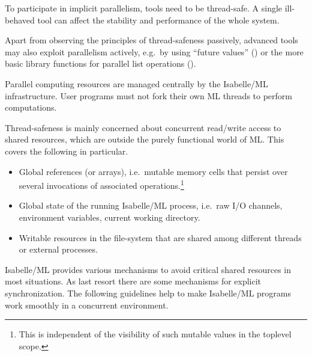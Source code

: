 \begin{isabellebody}
\begin{isamarkuptext}
  \begin{warn}
  To participate in implicit parallelism, tools need to be
  thread-safe.  A single ill-behaved tool can affect the stability and
  performance of the whole system.
  \end{warn}

  Apart from observing the principles of thread-safeness passively,
  advanced tools may also exploit parallelism actively, e.g.\ by using
  ``future values'' () or the more basic library
  functions for parallel list operations ().

  \begin{warn}
  Parallel computing resources are managed centrally by the
  Isabelle/ML infrastructure.  User programs must not fork their own
  ML threads to perform computations.
  \end{warn}%
\end{isamarkuptext}%
\isamarkuptrue%
%
\isamarkuptrue%
%
\begin{isamarkuptext}%
Thread-safeness is mainly concerned about concurrent
  read/write access to shared resources, which are outside the purely
  functional world of ML.  This covers the following in particular.

  \begin{itemize}

  \item Global references (or arrays), i.e.\ mutable memory cells that
  persist over several invocations of associated
  operations.\footnote{This is independent of the visibility of such
  mutable values in the toplevel scope.}

  \item Global state of the running Isabelle/ML process, i.e.\ raw I/O
  channels, environment variables, current working directory.

  \item Writable resources in the file-system that are shared among
  different threads or external processes.

  \end{itemize}

  Isabelle/ML provides various mechanisms to avoid critical shared
  resources in most situations.  As last resort there are some
  mechanisms for explicit synchronization.  The following guidelines
  help to make Isabelle/ML programs work smoothly in a concurrent
  environment.

  \begin{itemize}


\end{itemize}
\end{isamarkuptext}
\end{isabellebody}
